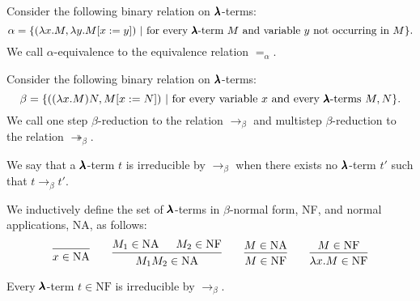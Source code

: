 \begin{definition}
  Consider the following binary relation on $\pmb{\lambda}$-terms:  
  \[
    \alpha = \{ (\lambda x . M, \lambda y . M[x := y]) \
                | \ \text{for every $\pmb{\lambda}$-term $M$ and variable $y$ not occurring in $M$} \}.
  \]  
  We call $\alpha$-equivalence to the equivalence relation $=_\alpha$.
\end{definition}




\begin{definition}
  \label{beta-reduction}
  Consider the following binary relation on $\pmb{\lambda}$-terms:  
  \[
    \beta = \{ ((\lambda x . M) N, M[x := N]) \
                | \ \text{for every variable $x$ and every $\pmb{\lambda}$-terms $M, N$} \}.
  \]  
  We call one step $\beta$-reduction to the relation $\to_\beta$ and multistep $\beta$-reduction to the relation $\twoheadrightarrow_\beta$.
\end{definition}


\begin{definition}  
  We say that a $\pmb{\lambda}$-term $t$ is irreducible by $\to_\beta$ when there exists no $\pmb{\lambda}$-term $t'$ such that $t \to_\beta t'$.
\end{definition}


\begin{definition}
  \label{beta-nfs}
  We inductively define the set of $\pmb{\lambda}$-terms in $\beta$-normal form, NF, and normal applications, NA, as follows:
  \[
    \begin{prooftree}
      \infer0{ x \in \text{NA} } 
    \end{prooftree}
    \qquad
    \begin{prooftree}
      \hypo{ M_1 \in \text{NA} }
      \hypo{ M_2 \in \text{NF} }            
      \infer2{ M_1 M_2 \in \text{NA} } 
    \end{prooftree}
    \qquad
    \begin{prooftree}
      \hypo{ M \in \text{NA} }
      \infer1{ M \in \text{NF} } 
    \end{prooftree}
    \qquad
    \begin{prooftree}
      \hypo{ M \in \text{NF} }
      \infer1{ \lambda x . M \in \text{NF} } 
    \end{prooftree}
  \]
\end{definition}


\begin{claim}
  \label{beta_nfs_claim}
  Every $\pmb{\lambda}$-term $t \in \text{NF}$ is irreducible by $\to_\beta$.
\end{claim}


